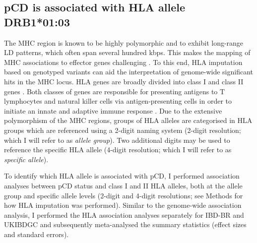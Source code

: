 \subsection{pCD is associated with HLA allele DRB1*01:03}
The MHC region is known to be highly polymorphic and to exhibit long-range LD patterns, which often span several hundred kbps. This makes the mapping of MHC associations to effector genes challenging \cite{Matzaraki2017-za}. To this end, HLA imputation based on genotyped variants can aid the interpretation of genome-wide significant hits in the MHC locus. HLA genes are broadly divided into class I and class II genes \cite{Marsh2010-mq}. Both classes of genes are responsible for presenting antigens to T lymphocytes and natural killer cells via antigen-presenting cells in order to initiate an innate and adaptive immune response \cite{Shiina2009-wt}. Due to the extensive polymorphism of the MHC regions, groups of HLA alleles are categorised in HLA groups which are referenced using a 2-digit naming system \cite{hla-nomenclature} (2-digit resolution; which I will refer to as \textit{allele group}). Two additional digits may be used to reference the specific HLA allele \cite{hla-nomenclature-4digit} (4-digit resolution; which I will refer to as \textit{specific allele}). 

To identify which HLA allele is associated with pCD, I performed association analyses between pCD status and class I and II HLA alleles, both at the allele group and specific allele levels (2-digit and 4-digit resolutions; see Methods for how HLA imputation was performed). Similar to the genome-wide association analysis, I performed the HLA association analyses separately for IBD-BR and UKIBDGC and subsequently meta-analysed the summary statistics (effect sizes and standard errors). \\

